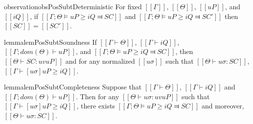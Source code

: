 \begin{restatable}{observation}{obsPosSubtDeterministic}
    \label{obs:pos-subt-deterministic}
    For fixed $[[Γ]]$, $[[Θ]]$, $[[uP]]$, and $[[iQ]]$,
    if $[[Γ ; Θ ⊨ uP ≥ iQ ⫤ SC]]$ and $[[Γ ; Θ ⊨ uP ≥ iQ ⫤ SC']]$
    then $[[SC]] = [[SC']]$.
\end{restatable}

\begin{restatable}{lemma}{lemPosSubtSoundness} \label{lemma:pos-subt-soundness}
    If $[[Γ ⊢ Θ]]$, $[[Γ ⊢ iQ]]$, $[[Γ ; dom(Θ) ⊢  uP]]$, and 
    $[[Γ ; Θ ⊨ uP ≥ iQ ⫤ SC]]$,
    then $[[Θ ⊢ SC : uv uP]]$ and
    for any normalized $[[uσ]]$ such that $[[ Θ ⊢ uσ : SC ]]$,
    $[[ Γ ⊢ [uσ]uP ≥ iQ ]]$.
\end{restatable}

\begin{restatable}{lemma}{lemPosSubtCompleteness} \label{lemma:pos-subt-completeness}
    Suppose that $[[Γ ⊢ Θ]]$, $[[Γ ⊢ iQ]]$ and $[[Γ ; dom(Θ) ⊢  uP]]$.
    Then for any $[[Θ ⊢ uσ : uv uP]]$ such that $[[ Γ ⊢ [uσ]uP ≥ iQ ]]$,
    there exists $[[Γ; Θ ⊨ uP ≥ iQ ⫤ SC]]$ and moreover, $[[ Θ ⊢ uσ : SC ]]$.
\end{restatable}

